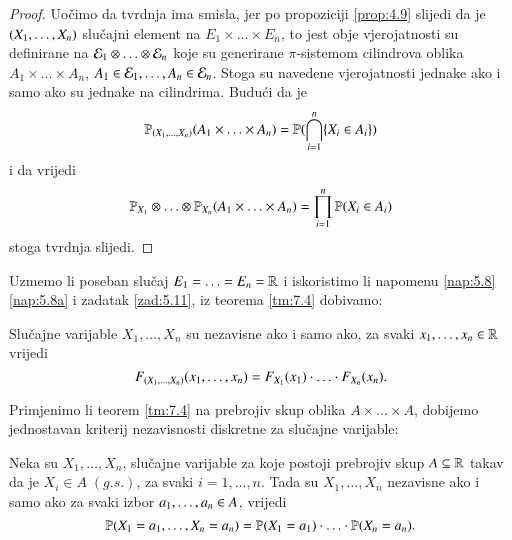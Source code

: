 \begin{proof}
    Uo\v cimo da tvrdnja ima smisla, jer po propoziciji \ref{prop:4.9} slijedi da je $({X}_1, \ldots, {X}_n)$ slu\v cajni element na $E_1 \times \ldots \times E_n$, to jest obje vjerojatnosti su definirane na $\mathcal{E}_1 \otimes \ldots \otimes \mathcal{E}_n$ koje su generirane $\pi$-sistemom cilindrova oblika $A_1 \times \ldots \times A_n$, $A_1 \in \mathcal{E}_1, \ldots, A_n \in \mathcal{E}_n$.
    Stoga su navedene vjerojatnosti jednake ako i samo ako su jednake na cilindrima.
    Budu\' ci da je
    \begin{equation*}
        \mathbb{P}_{({X}_1, \ldots, {X}_n)}(A_1 \times \ldots \times A_n) = \mathbb{P}({\bigcap\limits_{i = 1}^{n} \{ X_i \in A_i \}})
    \end{equation*}
    i da vrijedi
    \begin{equation*}
        \mathbb{P}_{X_1} \otimes \ldots \otimes \mathbb{P}_{X_n} (A_1 \times \ldots \times A_n) = \prod\limits_{i = 1}^{n} \mathbb{P}({X_i \in A_i})
    \end{equation*}
    stoga tvrdnja slijedi.
\end{proof}

Uzmemo li poseban slu\v caj $E_1 = \ldots = E_n = \mathbb{R}$ i iskoristimo li napomenu \ref{nap:5.8} \ref{nap:5.8a} i zadatak \ref{zad:5.11}, iz teorema \ref{tm:7.4} dobivamo:

\begin{kor} \label{kor:7.5}
    Slu\v cajne varijable $X_1, \ldots, X_n$ su nezavisne ako i samo ako, za svaki $x_1, \ldots, x_n \in \mathbb{R}$ vrijedi
    \begin{equation*}
        F_{({X}_1, \ldots, {X}_n)}(x_1, \ldots, x_n) = F_{X_1} (x_1) \cdot \ldots \cdot F_{X_n} (x_n).
    \end{equation*}
\end{kor}

Primjenimo li teorem \ref{tm:7.4} na prebrojiv skup oblika $A \times \ldots \times A$, dobijemo jednostavan kriterij nezavisnosti diskretne za slu\v cajne varijable:

\begin{kor} \label{kor:7.6}
    Neka su $X_1, \ldots, X_n$, slu\v cajne varijable za koje postoji prebrojiv skup $A \subseteq \mathbb{R}$ takav da je $X_i \in A \; (g.s.)$, za svaki $i = 1, \ldots, n$.
    Tada su $X_1, \ldots, X_n$ nezavisne ako i samo ako za svaki izbor ${a}_1, \ldots, {a}_n \in A$, vrijedi
    \begin{equation*}
        \mathbb{P} (X_1 = a_1, \ldots, X_n = a_n) = \mathbb{P}({X_1 = a_1}) \cdot \ldots \cdot \mathbb{P}({X_n = a_n}).
    \end{equation*}
\end{kor}

